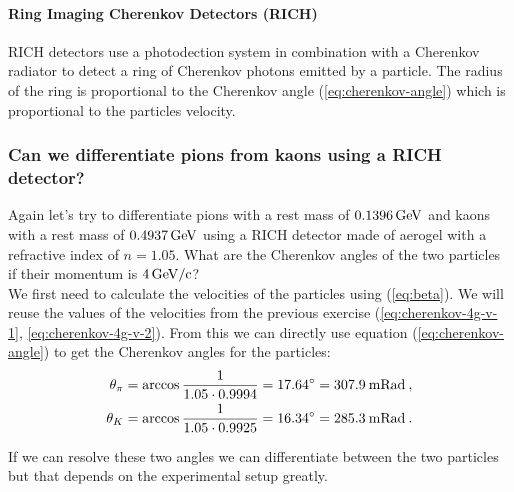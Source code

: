 \documentclass[10pt, titlepage, a4paper]{article}
\numberwithin{equation}{section}
\begin{document}
\paragraph{Ring Imaging Cherenkov Detectors (RICH)}
RICH detectors use a photodection system in combination with a Cherenkov radiator to detect a ring of Cherenkov photons emitted by 
a particle. The radius of the ring is proportional to the Cherenkov angle (\ref{eq:cherenkov-angle}) which is proportional to the 
particles velocity.
\subsubsection{Can we differentiate pions from kaons using a RICH detector?}
Again let's try to differentiate pions with a rest mass of $0.1396\,\rm{GeV}$ and kaons with a rest mass of $0.4937\,\rm{GeV}$ using a RICH detector 
made of aerogel with a refractive index of $n=1.05$. What are the Cherenkov angles of the two particles if their momentum is $4\,\rm{GeV/c}$? \\

We first need to calculate the velocities of the particles using (\ref{eq:beta}). We will reuse the values of the velocities from the previous exercise
(\ref{eq:cherenkov-4g-v-1}, \ref{eq:cherenkov-4g-v-2}). From this we can directly use equation (\ref{eq:cherenkov-angle}) to get the Cherenkov angles for the particles:
%
\begin{align*}
    \theta_\pi = \arccos{\frac{1}{1.05\cdot 0.9994}} = 17.64^\circ = 307.9\>\rm{mRad}\>, \\
    \theta_K = \arccos{\frac{1}{1.05\cdot 0.9925}} = 16.34^\circ = 285.3\>\rm{mRad}\>.
\end{align*}

If we can resolve these two angles we can differentiate between the two particles but that depends on the experimental setup greatly.

% 
% 

\end{document}
